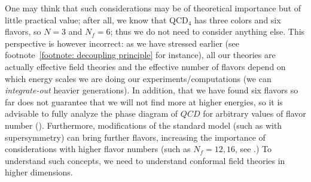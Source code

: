 {	One may think that such considerations may be of theoretical importance but of little practical value; after all, we know that QCD$_4$ has three colors and six flavors, so $N=3$ and $N_f=6$; thus we do not need to consider anything else. This \naive perspective is however incorrect: as we have stressed earlier (see footnote~\ref{footnote: decoupling principle} for instance), all our theories are actually effective field theories and the effective number of flavors depend on which energy scales we are doing our experiments/computations (we can \emph{integrate-out} heavier generations). In addition, that we have found six flavors so far does not guarantee that we will not find more at higher energies, so it is advisable to fully analyze the phase diagram of $QCD$ for arbitrary values of flavor number (). Furthermore, modifications of the standard model (such as with supersymmetry) can bring further flavors, increasing the importance of considerations with higher flavor numbers (such as $N_f=12,16$, see \cite{Aoki:2011cmy}.)
} To understand such concepts, we need to understand conformal field theories in higher dimensions.

